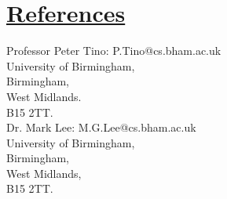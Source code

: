 \documentclass[11pt]{article}
\begin{document}
				
	\vspace{-20pt}
	\hspace{-100pt}\section*{\underline{References}}	
				\begin{multicols}{2}
					\noindent
					Professor Peter Tino:  P.Tino@cs.bham.ac.uk  \\
					University of Birmingham,\\
					Birmingham, \\
					West Midlands.\\
					B15 2TT.\\
	
					\noindent
					Dr. Mark Lee: M.G.Lee@cs.bham.ac.uk\\
					University of Birmingham,\\
					Birmingham,\\
					West Midlands,\\
					B15 2TT.\\
				\end{multicols}
\end{document}

